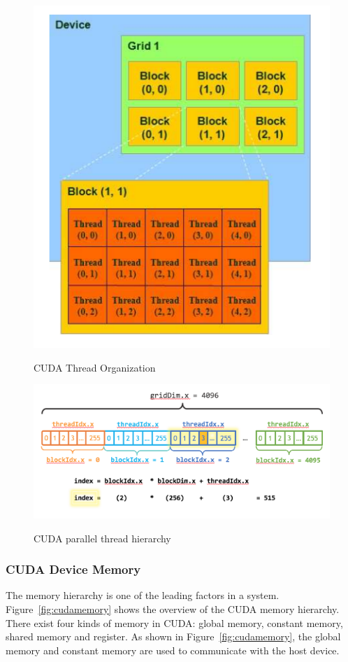 \documentclass[Ingles]{ic-tese-v1}
\newcommand{\rfig}[1]{Figure~\ref{fig:#1}}
\begin{document}
\begin{figure}[h]
	\centering
	\caption{CUDA Thread Organization}
	\includegraphics[scale=0.45]{images/thread_organization.png}
	\label{fig:threadorganization}
\end{figure}
\begin{figure}[h!]
	\caption{CUDA parallel thread hierarchy}
	\centering
	\includegraphics[scale=0.50]{images/cuda_indexing.png}
	\label{fig:cudaindex}
\end{figure}

\newpage
\subsubsection{CUDA Device Memory}
\label{CUDA Device Memory}
The memory hierarchy is one of the leading factors in a system. \rfig{cudamemory} shows the overview of the CUDA memory hierarchy. There exist
four kinds of memory in CUDA: global memory, constant memory, shared memory and register. As shown in \rfig{cudamemory}, the global memory and constant memory are used to communicate with the host device.\\
\end{document}
